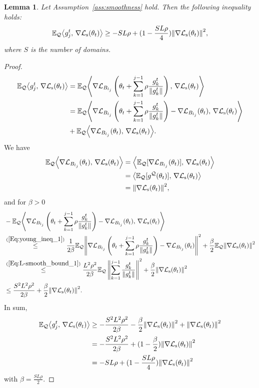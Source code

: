 \documentclass{article}
\theoremstyle{plain}
\newtheorem{lemma}[theorem]{Lemma}
\theoremstyle{definition}
\theoremstyle{remark}
\newcommand{\ip}[2]{{\left\langle #1, \, #2 \right\rangle}}
\newcommand{\no}[1]{{\left\lVert #1 \right\rVert}}
\newcommand{\EgQ}{\E_\gQ}
\begin{document}
\begin{lemma}\label{lem:2}
    Let Assumption~\ref{ass:smoothness} hold. Then the following inequality holds:
    \[
    \EgQ\ip{g_j^t}{\nabla \gL_{\text{s}}(\theta_t)} \geq -SL\rho + (1-\frac{SL\rho}{4})\no{\nabla \gL_{\text{s}}(\theta_t)}^2,
    \]
    where \(S\) is the number of domains.
\end{lemma}
\begin{proof}
\begin{align*} 
\EgQ\ip{g_j^t}{\nabla \gL_{\text{s}}(\theta_t)} &= \EgQ\ip{ \nabla\gL_{B_{l_j}}\left(\theta_t+\sum\limits_{k=1}^{j-1}\rho\frac{g_k^t}{\lVert g_k^t \rVert}\right)}{\nabla \gL_{\text{s}}(\theta_t)} \\
&= \EgQ\ip{ \nabla\gL_{B_{l_j}}\left(\theta_t+\sum\limits_{k=1}^{j-1}\rho\frac{g_k^t}{\lVert g_k^t \rVert}\right)-\nabla\gL_{B_{l_j}}(\theta_t)}{\nabla \gL_{\text{s}}(\theta_t)} \\&+ \EgQ\ip{\nabla\gL_{B_{l_j}}(\theta_t)}{\nabla \gL_{\text{s}}(\theta_t)}.
\end{align*}
We have
\begin{align*}
    \EgQ\ip{\nabla\gL_{B_{l_j}}(\theta_t)}{\nabla \gL_{\text{s}}(\theta_t)} &= \ip{\EgQ[\nabla\gL_{B_{l_j}}(\theta_t)]}{\nabla \gL_{\text{s}}(\theta_t)} \\ 
    &= \ip{\EgQ[g^{\gQ}(\theta_t)]}{\nabla \gL_{\text{s}}(\theta_t)} \\
    & = \no{\nabla \gL_{\text{s}}(\theta_t)}^2,
\end{align*}
and for \(\beta>0\)
\begin{align*}
    &-\EgQ\ip{\nabla\gL_{B_{l_j}}\left(\theta_t+\sum\limits_{k=1}^{j-1}\rho\frac{g_k^t}{\lVert g_k^t \rVert}\right)-\nabla\gL_{B_{l_j}}(\theta_t)}{\nabla \gL_{\text{s}}(\theta_t)} \\ 
    &\overset{(\ref{Eq:young_ineq_1})}{\leq} \frac{1}{2\beta}\EgQ\no{\nabla\gL_{B_{l_j}}\left(\theta_t+\sum\limits_{k=1}^{j-1}\rho\frac{g_k^t}{\lVert g_k^t \rVert}\right)-\nabla\gL_{B_{l_j}}(\theta_t)}^2+\frac{\beta}{2}\EgQ\no{\nabla \gL_{\text{s}}(\theta_t)}^2 \\
    &\overset{(\ref{Eq:L-smooth_bound_1})}{\leq} \frac{L^2\rho^2}{2\beta}\EgQ\left\lV \sum\limits_{k=1}^{j-1}\frac{g_k^t}{\lVert g_k^t \rVert} \right\rV^2+\frac{\beta}{2}\no{\nabla \gL_{\text{s}}(\theta_t)}^2\\
    &\leq \frac{S^2L^2\rho^2}{2\beta}+\frac{\beta}{2}\no{\nabla \gL_{\text{s}}(\theta_t)}^2.
\end{align*}
In sum,
\begin{align*}
    \EgQ\ip{g_j^t}{\nabla \gL_{\text{s}}(\theta_t)} &\geq -\frac{S^2L^2\rho^2}{2\beta}-\frac{\beta}{2}\no{\nabla \gL_{\text{s}}(\theta_t)}^2+\no{\nabla \gL_{\text{s}}(\theta_t)}^2 \\
    &= -\frac{S^2L^2\rho^2}{2\beta} + (1-\frac{\beta}{2})\no{\nabla \gL_{\text{s}}(\theta_t)}^2 \\
    &= -SL\rho + (1-\frac{SL\rho}{4})\no{\nabla \gL_{\text{s}}(\theta_t)}^2
\end{align*}
with \(\beta = \frac{SL\rho}{2}\).
\end{proof}
\end{document}
